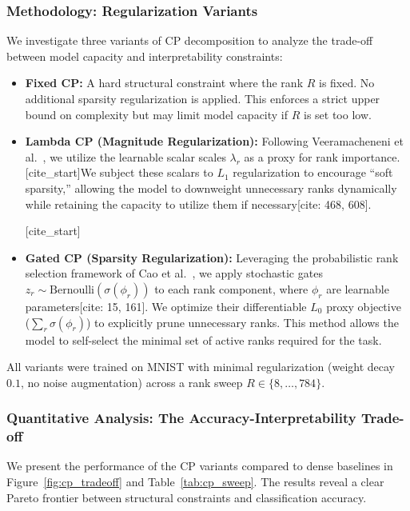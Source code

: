 \subsubsection{Methodology: Regularization Variants}

We investigate three variants of CP decomposition to analyze the trade-off between model capacity and interpretability constraints:

\begin{itemize}
    \item \textbf{Fixed CP:} A hard structural constraint where the rank $R$ is fixed. No additional sparsity regularization is applied. This enforces a strict upper bound on complexity but may limit model capacity if $R$ is set too low.
    
    \item \textbf{Lambda CP (Magnitude Regularization):} Following Veeramacheneni et al.~\cite{veeramacheneni2022canonical}, we utilize the learnable scalar scales $\lambda_r$ as a proxy for rank importance. [cite_start]We subject these scalars to $L_1$ regularization to encourage ``soft sparsity,'' allowing the model to downweight unnecessary ranks dynamically while retaining the capacity to utilize them if necessary[cite: 468, 608].
    
    [cite_start]\item \textbf{Gated CP (Sparsity Regularization):} Leveraging the probabilistic rank selection framework of Cao et al.~\cite{cao2024learning}, we apply stochastic gates $z_r \sim \text{Bernoulli}(\sigma(\phi_r))$ to each rank component, where $\phi_r$ are learnable parameters[cite: 15, 161]. We optimize their differentiable $L_0$ proxy objective ($\sum_r \sigma(\phi_r)$) to explicitly prune unnecessary ranks. This method allows the model to self-select the minimal set of active ranks required for the task.
\end{itemize}

All variants were trained on MNIST with minimal regularization (weight decay $0.1$, no noise augmentation) across a rank sweep $R \in \{8, \dots, 784\}$.

\subsubsection{Quantitative Analysis: The Accuracy-Interpretability Trade-off}

We present the performance of the CP variants compared to dense baselines in Figure~\ref{fig:cp_tradeoff} and Table~\ref{tab:cp_sweep}. The results reveal a clear Pareto frontier between structural constraints and classification accuracy.

